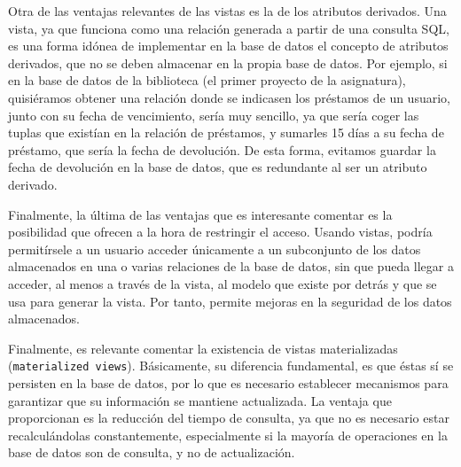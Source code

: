 \documentclass[12pt, a4paper]{article}
\begin{document}
Otra de las ventajas relevantes de las vistas es la de los atributos derivados. Una vista, ya que funciona como una relación generada a partir de una consulta SQL, es una forma idónea de implementar en la base de datos el concepto de atributos derivados, que no se deben almacenar en la propia base de datos. Por ejemplo, si en la base de datos de la biblioteca (el primer proyecto de la asignatura), quisiéramos obtener una relación donde se indicasen los préstamos de un usuario, junto con su fecha de vencimiento, sería muy sencillo, ya que sería coger las tuplas que existían en la relación de préstamos, y sumarles 15 días a su fecha de préstamo, que sería la fecha de devolución. De esta forma, evitamos guardar la fecha de devolución en la base de datos, que es redundante al ser un atributo derivado.

Finalmente, la última de las ventajas que es interesante comentar es la posibilidad que ofrecen a la hora de restringir el acceso. Usando vistas, podría permitírsele a un usuario acceder únicamente a un subconjunto de los datos almacenados en una o varias relaciones de la base de datos, sin que pueda llegar a acceder, al menos a través de la vista, al modelo que existe por detrás y que se usa para generar la vista. Por tanto, permite mejoras en la seguridad de los datos almacenados.

Finalmente, es relevante comentar la existencia de vistas materializadas (\texttt{materialized views}). Básicamente, su diferencia fundamental, es que éstas sí se persisten en la base de datos, por lo que es necesario establecer mecanismos para garantizar que su información se mantiene actualizada. La ventaja que proporcionan es la reducción del tiempo de consulta, ya que no es necesario estar recalculándolas constantemente, especialmente si la mayoría de operaciones en la base de datos son de consulta, y no de actualización.

\nocite{*}

\end{document}
